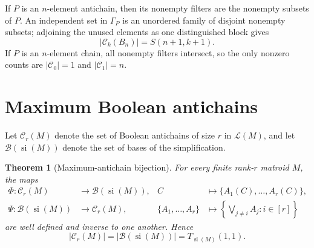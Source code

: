 \documentclass[11pt]{article}
\newtheorem{theorem}{Theorem}[section]
\theoremstyle{definition}
\theoremstyle{remark}
\newcommand{\si}{\operatorname{si}}
\newcommand{\cL}{\mathcal L}
\newcommand{\cB}{\mathcal B}
\newcommand{\cC}{\mathcal C}
\begin{document}
If $P$ is an $n$-element antichain, then its nonempty filters are the
nonempty subsets of $P$.  An independent set in $\Gamma_P$ is an unordered
family of disjoint nonempty subsets; adjoining the unused elements as one
distinguished block gives
\[
 |\cC_k(B_n)|=S(n+1,k+1).
\]
If $P$ is an $n$-element chain, all nonempty filters intersect, so the only
nonzero counts are $|\cC_0|=1$ and $|\cC_1|=n$.

\section{Maximum Boolean antichains}

Let $\cC_r(M)$ denote the set of Boolean antichains of size $r$ in
$\cL(M)$, and let $\cB(\si(M))$ denote the set of bases of the
simplification.

\begin{theorem}[Maximum-antichain bijection]\label{thm:main}
For every finite rank-$r$ matroid $M$, the maps
\begin{align*}
 \Phi:\cC_r(M)&\longrightarrow\cB(\si(M)),
 &C&\longmapsto\{A_1(C),\ldots,A_r(C)\},\\
 \Psi:\cB(\si(M))&\longrightarrow\cC_r(M),
 &\{A_1,\ldots,A_r\}&\longmapsto
   \left\{\bigvee_{j\ne i}A_j:i\in[r]\right\}
\end{align*}
are well defined and inverse to one another.
Hence
\begin{equation}\label{eq:max-count}
 |\cC_r(M)|=|\cB(\si(M))|=T_{\si(M)}(1,1).
\end{equation}
\end{theorem}
\end{document}

